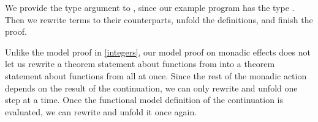 We provide the type argument  to , since our example program has the type . Then we rewrite  terms to their  counterparts, unfold the  definitions, and finish the proof.

Unlike the model proof in \autoref{integers}, our model proof on monadic effects does not let us rewrite a theorem statement about functions from  into a theorem statement about functions from  all at once. Since the rest of the monadic action depends on the result of the continuation, we can only rewrite and unfold one step at a time. Once the \gls{functional model} definition of the continuation is evaluated, we can rewrite and unfold it once again.